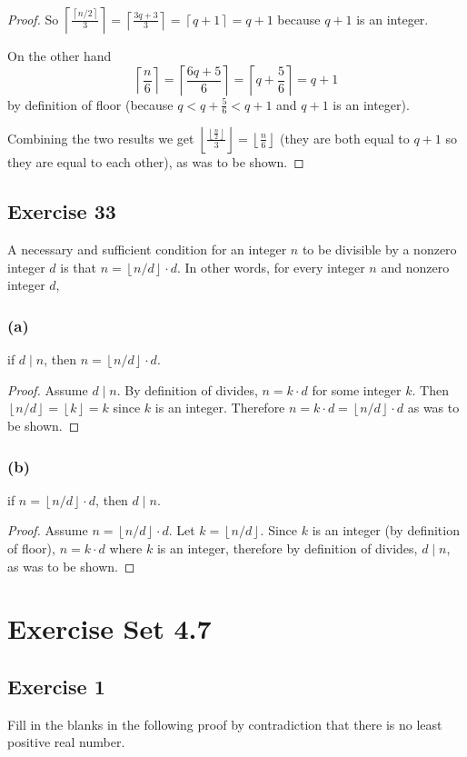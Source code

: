 \documentclass[14pt]{extarticle}
\newcommand{\floor}[1]{{\left\lfloor#1\right\rfloor}}
\newcommand{\ceil}[1]{{\left\lceil#1\right\rceil}}
\begin{document}
\begin{proof}
So $\ceil{\frac{\ceil{n/2}}{3}} = \ceil{\frac{3q+3}{3}} = \ceil{q+1} = q+1$ because $q+1$ is an integer.

On the other hand 
\[
\ceil{\frac{n}{6}} = \ceil{\frac{6q+5}{6}} = \ceil{q+\frac{5}{6}} = q+1
\]
by definition of floor (because $q < q+\frac{5}{6} < q+1$ and $q+1$ is an integer).

Combining the two results we get $ \floor{\frac{\floor{\frac{n}{2}}}{3}} = \floor{\frac{n}{6}}$ (they are both equal to $q+1$ so they are equal to each other), as was to be shown.
\end{proof}

\subsection{Exercise 33}
A necessary and sufficient condition for an integer $n$ to be divisible by a nonzero integer $d$ is that $n = \floor{n/d} \cdot d$. In other words, for every integer $n$ and nonzero integer $d$, 

\subsubsection{(a)}
if $d \mid n$, then $n = \floor{n/d} \cdot d$.

\begin{proof}
Assume $d \mid n$. By definition of divides, $n = k \cdot d$ for some integer $k$. Then $\floor{n/d} = \floor{k} = k$ since $k$ is an integer. Therefore $n = k \cdot d = \floor{n/d} \cdot d$ as was to be shown.
\end{proof}

\subsubsection{(b)}
if $n = \floor{n/d} \cdot d$, then $d \mid n$.

\begin{proof}
Assume $n = \floor{n/d} \cdot d$. Let $k = \floor{n/d}$. Since $k$ is an integer (by definition of floor), $n = k \cdot d$ where $k$ is an integer, therefore by definition of divides, $d \mid n$, as was to be shown.
\end{proof}

\section{Exercise Set 4.7}
\subsection{Exercise 1}
Fill in the blanks in the following proof by contradiction that there is no least positive real number.
\end{document}
